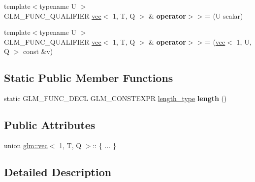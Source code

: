 \begin{DoxyCompactItemize}
\item 
\mbox{\label{structglm_1_1vec_3_011_00_01T_00_01Q_01_4_afe1c0569bc10df48602abfda91892c98}} 
{\footnotesize template$<$typename U $>$ }\\G\+L\+M\+\_\+\+F\+U\+N\+C\+\_\+\+Q\+U\+A\+L\+I\+F\+I\+ER \hyperlink{structglm_1_1vec}{vec}$<$ 1, T, Q $>$ \& {\bfseries operator$>$$>$=} (U scalar)
\item 
\mbox{\label{structglm_1_1vec_3_011_00_01T_00_01Q_01_4_a5f338e27a69533420079adc1daaab092}} 
{\footnotesize template$<$typename U $>$ }\\G\+L\+M\+\_\+\+F\+U\+N\+C\+\_\+\+Q\+U\+A\+L\+I\+F\+I\+ER \hyperlink{structglm_1_1vec}{vec}$<$ 1, T, Q $>$ \& {\bfseries operator$>$$>$=} (\hyperlink{structglm_1_1vec}{vec}$<$ 1, U, Q $>$ const \&v)
\end{DoxyCompactItemize}
\subsection*{Static Public Member Functions}
\begin{DoxyCompactItemize}
\item 
\mbox{\label{structglm_1_1vec_3_011_00_01T_00_01Q_01_4_a225b4ffa0391c3f0c64d1b43cf7a662d}} 
static G\+L\+M\+\_\+\+F\+U\+N\+C\+\_\+\+D\+E\+CL G\+L\+M\+\_\+\+C\+O\+N\+S\+T\+E\+X\+PR \hyperlink{structglm_1_1vec_3_011_00_01T_00_01Q_01_4_a37415eee3b59cf93cdb752a2b30fe5e6}{length\+\_\+type} {\bfseries length} ()
\end{DoxyCompactItemize}
\subsection*{Public Attributes}
\begin{DoxyCompactItemize}
\item 
\mbox{\label{structglm_1_1vec_3_011_00_01T_00_01Q_01_4_aff0905b586c80f7f6ef1e0c22c4e57ed}} 
union \hyperlink{structglm_1_1vec}{glm\+::vec}$<$ 1, T, Q $>$\+:: \{ ... \}  
\end{DoxyCompactItemize}


\subsection{Detailed Description}
